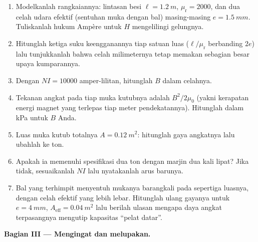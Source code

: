\begin{problem}
\begin{enumerate}[resume]
  \item Modelkanlah rangkaiannya: lintasan besi $\ell = \qty{1.2}{m}$,
        $\mu_{\text{r}} = 2000$, dan dua celah udara efektif
        (sentuhan muka dengan bal) masing-masing $e = \qty{1.5}{mm}$. Tuliskanlah
        hukum Ampère untuk $H$ mengelilingi gelungnya.
  \item Hitunglah ketiga suku keengganannya tiap satuan luas
        ($\ell/\mu_{\text{r}}$ berbanding $2e$) lalu tunjukkanlah
        bahwa celah milimeternya tetap memakan sebagian besar upaya
        kumparannya.
  \item Dengan $NI = \num{10000}$ amper-lilitan, hitunglah $B$ dalam
        celahnya.
  \item Tekanan angkat pada tiap muka kutubnya adalah $B^2/2\mu_0$
        (yakni kerapatan energi magnet yang terlepas tiap meter pendekatannya).
        Hitunglah dalam \unit{kPa} untuk $B$ Anda.
  \item Luas muka kutub totalnya $A = \qty{0.12}{m^2}$: hitunglah gaya
        angkatnya lalu ubahlah ke ton.
  \item Apakah ia memenuhi spesifikasi dua ton dengan marjin dua kali
        lipat? Jika tidak, sesuaikanlah $NI$ lalu nyatakanlah arus barunya.
  \item Bal yang terhimpit menyentuh mukanya barangkali pada sepertiga
        luasnya, dengan celah efektif yang lebih lebar. Hitunglah ulang gayanya untuk
        $e = \qty{4}{mm}$, $A_{\text{eff}} = \qty{0.04}{m^2}$ lalu
        berilah ulasan mengapa daya angkat terpasangnya mengutip kapasitas ``pelat datar''.
\end{enumerate}

\medskip\noindent\textbf{Bagian III --- Mengingat dan melupakan.}


\end{problem}

